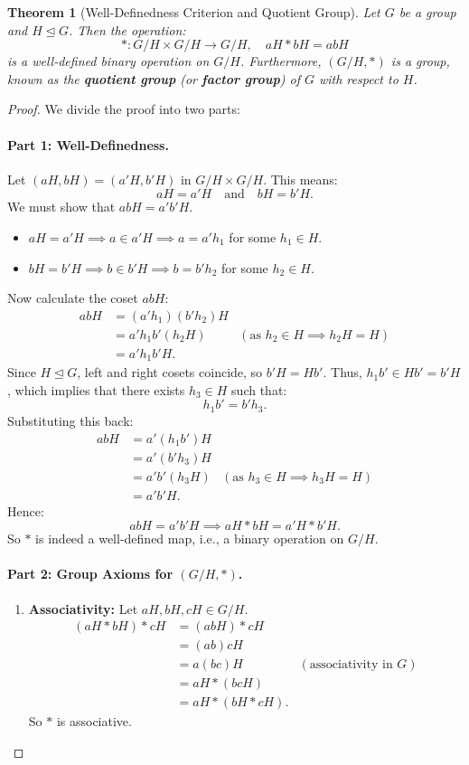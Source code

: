\documentclass[12pt]{article}
\theoremstyle{definition}
\theoremstyle{plain}
\newtheorem{theorem}{Theorem}[section]
\begin{document}
\begin{theorem}[Well-Definedness Criterion and Quotient Group]
Let $G$ be a group and $H \trianglelefteq G$. Then the operation:
\[
*: G/H \times G/H \to G/H, \quad aH * bH = abH
\]
is a well-defined binary operation on $G/H$. Furthermore, $(G/H, *)$ is a group, known as the \textbf{quotient group} (or \textbf{factor group}) of $G$ with respect to $H$.
\end{theorem}

\begin{proof}
We divide the proof into two parts:
\paragraph{Part 1: Well-Definedness.}
Let $(aH, bH) = (a'H, b'H)$ in $G/H \times G/H$. This means:
\[
aH = a'H \quad \text{and} \quad bH = b'H.
\]
We must show that $abH = a'b'H$.
\begin{itemize}
    \item $aH = a'H \implies a \in a'H \implies a = a' h_1$ for some $h_1 \in H$.
    \item $bH = b'H \implies b \in b'H \implies b = b' h_2$ for some $h_2 \in H$.
\end{itemize}
Now calculate the coset $abH$:
\begin{align*}
abH &= (a' h_1)(b' h_2)H \\
&= a' h_1 b' (h_2 H) & (\text{as } h_2 \in H \implies h_2 H = H) \\
&= a' h_1 b' H.
\end{align*}
Since $H \trianglelefteq G$, left and right cosets coincide, so $b' H = H b'$.
Thus, $h_1 b' \in H b' = b' H$, which implies that there exists $h_3 \in H$ such that:
\[
h_1 b' = b' h_3.
\]
Substituting this back:
\begin{align*}
abH &= a' (h_1 b') H \\
&= a' (b' h_3) H \\
&= a' b' (h_3 H) & (\text{as } h_3 \in H \implies h_3 H = H) \\
&= a' b' H.
\end{align*}
Hence:
\[
abH = a'b'H \implies aH * bH = a'H * b'H.
\]
So $*$ is indeed a well-defined map, i.e., a binary operation on $G/H$.

\paragraph{Part 2: Group Axioms for $(G/H, *)$.}
\begin{enumerate}
    \item \textbf{Associativity:}
    Let $aH, bH, cH \in G/H$.
    \begin{align*}
    (aH * bH) * cH &= (abH) * cH \\
    &= (ab)cH \\
    &= a(bc)H & (\text{associativity in } G) \\
    &= aH * (bcH) \\
    &= aH * (bH * cH).
    \end{align*}
    So $*$ is associative.
    

\end{enumerate}
\end{proof}
\end{document}
